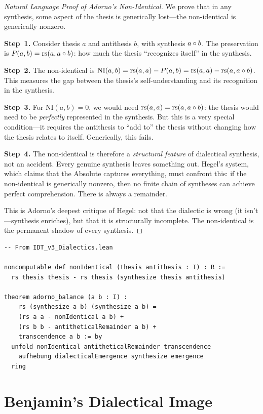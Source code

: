 \begin{proof}[Natural Language Proof of Adorno's Non-Identical]
We prove that in any synthesis, some aspect of the thesis is generically
lost---the non-identical is generically nonzero.

\textbf{Step~1.} Consider thesis $a$ and antithesis $b$, with synthesis
$a \circ b$. The preservation is $P(a, b) = \mathrm{rs}(a, a \circ b)$:
how much the thesis ``recognizes itself'' in the synthesis.

\textbf{Step~2.} The non-identical is $\mathrm{NI}(a, b) = \mathrm{rs}(a, a) -
P(a, b) = \mathrm{rs}(a, a) - \mathrm{rs}(a, a \circ b)$. This measures the gap
between the thesis's self-understanding and its recognition in the synthesis.

\textbf{Step~3.} For $\mathrm{NI}(a, b) = 0$, we would need $\mathrm{rs}(a, a) =
\mathrm{rs}(a, a \circ b)$: the thesis would need to be \emph{perfectly}
represented in the synthesis. But this is a very special condition---it
requires the antithesis to ``add to'' the thesis without changing how the
thesis relates to itself. Generically, this fails.

\textbf{Step~4.} The non-identical is therefore a \emph{structural feature}
of dialectical synthesis, not an accident. Every genuine synthesis leaves
something out. Hegel's system, which claims that the Absolute captures
everything, must confront this: if the non-identical is generically nonzero,
then no finite chain of syntheses can achieve perfect comprehension. There
is always a remainder.

This is Adorno's deepest critique of Hegel: not that the dialectic is wrong
(it isn't---synthesis enriches), but that it is structurally incomplete.
The non-identical is the permanent shadow of every synthesis.
\end{proof}

\begin{lstlisting}
-- From IDT_v3_Dialectics.lean

noncomputable def nonIdentical (thesis antithesis : I) : R :=
  rs thesis thesis - rs thesis (synthesize thesis antithesis)

theorem adorno_balance (a b : I) :
    rs (synthesize a b) (synthesize a b) =
    (rs a a - nonIdentical a b) +
    (rs b b - antitheticalRemainder a b) +
    transcendence a b := by
  unfold nonIdentical antitheticalRemainder transcendence
    aufhebung dialecticalEmergence synthesize emergence
  ring
\end{lstlisting}

\section{Benjamin's Dialectical Image}

